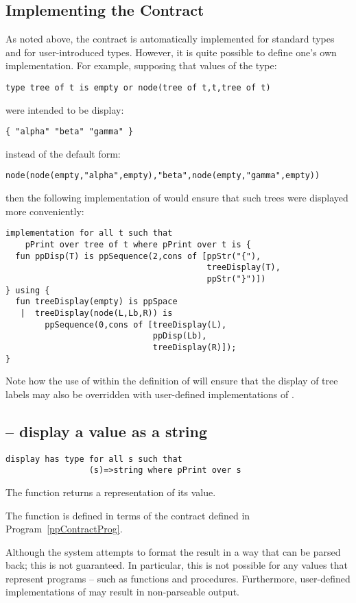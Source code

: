 \subsection{Implementing the  Contract}
As noted above, the  contract is automatically implemented for standard types and for user-introduced types. However, it is quite possible to define one's own implementation. For example, supposing that values of the  type:
\begin{lstlisting}
type tree of t is empty or node(tree of t,t,tree of t)
\end{lstlisting}
were intended to be display:
\begin{lstlisting}
{ "alpha" "beta" "gamma" }
\end{lstlisting}
instead of the default form:
\begin{lstlisting}
node(node(empty,"alpha",empty),"beta",node(empty,"gamma",empty))
\end{lstlisting}
then the following implementation of  would ensure that such trees were displayed more conveniently:
\begin{lstlisting}
implementation for all t such that
    pPrint over tree of t where pPrint over t is {
  fun ppDisp(T) is ppSequence(2,cons of [ppStr("{"),
                                         treeDisplay(T),
                                         ppStr("}")])
} using {
  fun treeDisplay(empty) is ppSpace
   |  treeDisplay(node(L,Lb,R)) is 
        ppSequence(0,cons of [treeDisplay(L),
                              ppDisp(Lb),
                              treeDisplay(R)]);
}
\end{lstlisting}
\begin{aside}
Note how the use of  within the definition of  will ensure that the display of tree labels may also be overridden with user-defined implementations of .
\end{aside}

\subsection{ -- display a value as a string}
\label{displayFunction}
\begin{lstlisting}
display has type for all s such that 
                 (s)=>string where pPrint over s
\end{lstlisting}
The  function returns a  representation of its value.

The  function is defined in terms of the  contract defined in Program~\vref{ppContractProg}.
\begin{aside}
Although the system attempts to format the result in a way that can be parsed back; this is not guaranteed. In particular, this is not possible for any values that represent programs -- such as functions and procedures. Furthermore, user-defined implementations of  may result in non-parseable output.
\end{aside}

